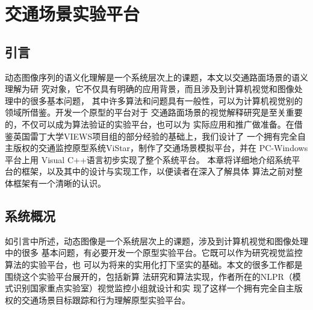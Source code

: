 \chapter{交通场景实验平台}
\label{chap3} \fontsize{12pt}{12pt}\selectfont

\section{引言}

动态图像序列的语义化理解是一个系统层次上的课题，本文以交通路面场景的语义理解为研
究对象，它不仅具有明确的应用背景，而且涉及到计算机视觉和图像处理中的很多基本问题，
其中许多算法和问题具有一般性，可以为计算机视觉别的领域所借鉴。开发一个原型的平台对于
交通路面场景的视觉解释研究是至关重要的，不仅可以成为算法验证的实验平台，也可以为
实际应用和推广做准备。在借鉴英国雷丁大学VIEWS项目组的部分经验的基础上，我们设计了
一个拥有完全自主版权的交通监控原型系统ViStar，制作了交通场景模拟平台，并在
PC-Windows平台上用 Visual C++语言初步实现了整个系统平台。
本章将详细地介绍系统平台的框架，以及其中的设计与实现工作，以便读者在深入了解具体
算法之前对整体框架有一个清晰的认识。

\section{系统概况}

如引言中所述，动态图像是一个系统层次上的课题，涉及到计算机视觉和图像处理中的很多
基本问题，有必要开发一个原型实验平台。它既可以作为研究视觉监控算法的实验平台，也
可以为将来的实用化打下坚实的基础。本文的很多工作都是围绕这个实验平台展开的，包括新算
法研究和算法实现，作者所在的NLPR（模式识别国家重点实验室）视觉监控小组就设计和实
现了这样一个拥有完全自主版权的交通场景目标跟踪和行为理解原型实验平台。
